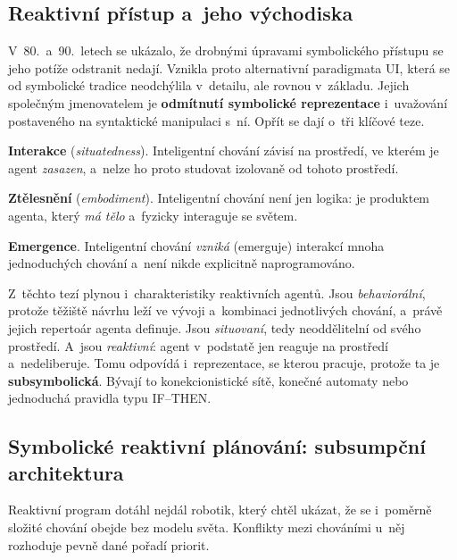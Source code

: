 \documentclass[11pt,a4paper]{article}
\theoremstyle{definition}
\begin{document}
\subsection{Reaktivní přístup a~jeho východiska}

V~80.\ a~90.\ letech se ukázalo, že drobnými úpravami symbolického přístupu se jeho potíže
odstranit nedají. Vznikla proto alternativní paradigmata UI, která se od symbolické tradice
neodchýlila v~detailu, ale rovnou v~základu. Jejich společným jmenovatelem je
\textbf{odmítnutí symbolické reprezentace} i~uvažování postaveného na syntaktické manipulaci
s~ní. Opřít se dají o~tři klíčové teze.

\begin{defbox}
\textbf{Interakce} (\emph{situatedness}). Inteligentní chování závisí na prostředí, ve kterém
je agent \emph{zasazen}, a~nelze ho proto studovat izolovaně od tohoto prostředí.

\textbf{Ztělesnění} (\emph{embodiment}). Inteligentní chování není jen logika: je produktem
agenta, který \emph{má tělo} a~fyzicky interaguje se světem.

\textbf{Emergence}. Inteligentní chování \emph{vzniká} (emerguje) interakcí mnoha jednoduchých
chování a~není nikde explicitně naprogramováno.
\end{defbox}

Z~těchto tezí plynou i~charakteristiky reaktivních agentů. Jsou \emph{behaviorální}, protože
těžiště návrhu leží ve vývoji a~kombinaci jednotlivých chování, a~právě jejich repertoár
agenta definuje. Jsou \emph{situovaní}, tedy neoddělitelní od svého prostředí. A~jsou
\emph{reaktivní}: agent v~podstatě jen reaguje na prostředí a~nedeliberuje. Tomu odpovídá
i~reprezentace, se kterou pracuje, protože ta je \textbf{subsymbolická}. Bývají to
konekcionistické sítě, konečné automaty nebo jednoduchá pravidla typu IF--THEN.

\subsection{Symbolické reaktivní plánování: subsumpční architektura}
\label{ssec:subsumpce}

Reaktivní program dotáhl nejdál robotik, který chtěl ukázat, že se i~poměrně složité chování
obejde bez modelu světa. Konflikty mezi chováními u~něj rozhoduje pevně dané pořadí priorit.
\end{document}
